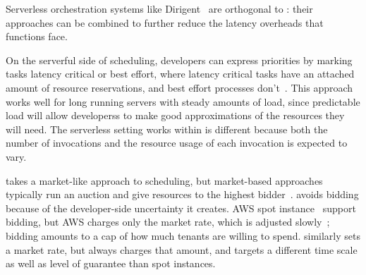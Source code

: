 Serverless orchestration systems like Dirigent~\cite{dirigent} are orthogonal to
\sys{}: their approaches can be combined to further reduce the latency overheads
that functions face.

On the serverful side of scheduling, developers can express priorities
by marking tasks latency critical or best effort, where latency
critical tasks have an attached amount of resource reservations, and
best effort processes don't~\cite{kubernetes-lc-be}.  This approach
works well for long running servers with steady amounts of load, since
predictable load will allow developerss to make good approximations of
the resources they will need. The serverless setting \sys{} works
within is different because both the number of invocations and the
resource usage of each invocation is expected to vary.

\Sys{} takes a market-like approach to scheduling, but market-based
approaches typically run an auction and give resources to the highest
bidder~\cite{bellagio-market-based,online-auctioning}. \Sys{} avoids
bidding because of the developer-side uncertainty it creates. AWS spot
instance~\cite{spot-instance-pricing} support bidding, but AWS charges
only the market rate, which is adjusted
slowly~\cite{spot-instance-history}; bidding amounts to a cap of how
much tenants are willing to spend. \Sys{} similarly sets a market
rate, but always charges that amount, and targets a different time
scale as well as level of guarantee than spot instances.


